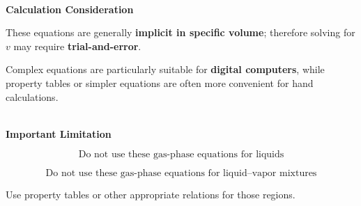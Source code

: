 \documentclass[12pt]{article}
\begin{document}
\textbf{\\ Calculation Consideration}

These equations are generally \textbf{implicit in specific volume}; therefore solving for $v$ may require \textbf{trial-and-error}.

Complex equations are particularly suitable for \textbf{digital computers}, while property tables or simpler equations are often more convenient for hand calculations.

\textbf{\\ Important Limitation}

\[
\boxed{\text{Do not use these gas-phase equations for liquids}}
\]

\[
\boxed{\text{Do not use these gas-phase equations for liquid--vapor mixtures}}
\]

Use property tables or other appropriate relations for those regions.
\end{document}
